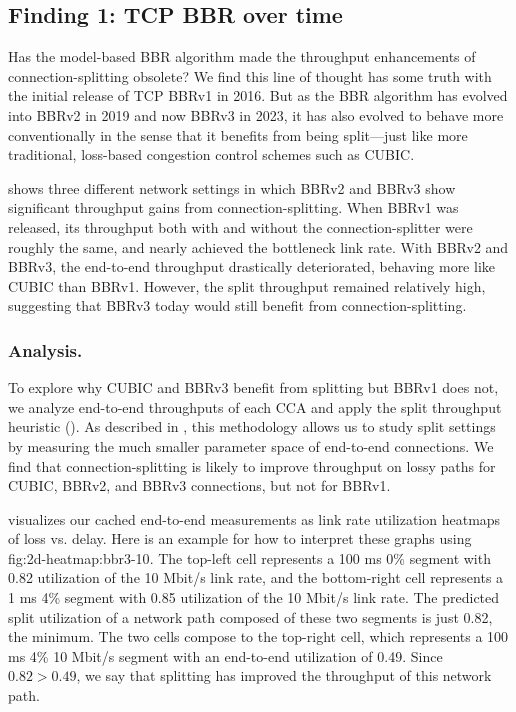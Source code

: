 \subsection{Finding 1: TCP BBR over time}
\label{sec:splitting:results:finding1}


Has the model-based BBR algorithm made the throughput enhancements of
connection-splitting obsolete? We find this line of thought has some truth
with the initial release of TCP BBRv1 in 2016. But as the BBR algorithm has
evolved into BBRv2 in 2019 and now BBRv3 in 2023, it has also evolved to behave
more conventionally in the sense that it benefits from being split---just like
more traditional, loss-based congestion control schemes such as CUBIC.

 shows three different network settings in which BBRv2
and BBRv3 show significant throughput gains from connection-splitting.
 When BBRv1 was released, its throughput both with and
 without the connection-splitter were roughly the same, and nearly achieved the
 bottleneck link rate. With BBRv2 and BBRv3, the end-to-end throughput
 drastically deteriorated, behaving more like CUBIC than BBRv1. However, the
 split throughput remained relatively high, suggesting that BBRv3 today would
 still benefit from connection-splitting.

\subsubsection{Analysis.}
To explore why CUBIC and BBRv3 benefit from splitting but BBRv1 does not, we
analyze end-to-end throughputs of each CCA and apply the split throughput
heuristic (). As described in ,
this methodology allows us to study split settings by measuring the much smaller
parameter space of end-to-end connections. We find that connection-splitting is
likely to improve throughput on lossy paths for CUBIC, BBRv2, and BBRv3
connections, but not for BBRv1.

 visualizes our cached end-to-end measurements as link rate
 utilization heatmaps of loss vs. delay.
 Here is an example for how to interpret these graphs using \Cref
 {fig:2d-heatmap:bbr3-10}. The top-left cell represents a 100 ms 0\% segment
 with 0.82 utilization of the 10 Mbit/s link rate, and the bottom-right cell
 represents a 1 ms 4\% segment with 0.85 utilization of the 10 Mbit/s link
 rate. The predicted split utilization of a network path composed of these two
 segments is just 0.82, the minimum. The two cells compose to the top-right
 cell, which represents a 100 ms 4\% 10 Mbit/s segment with an end-to-end
 utilization of 0.49. Since $0.82>0.49$, we say that splitting has improved the
 throughput of this network path.

